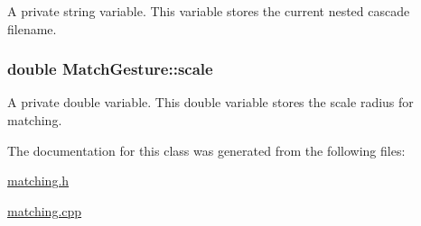 \label{classMatchGesture_aacb8c478358eee5b075988893f267737}
A private string variable. This variable stores the current nested cascade filename. \hypertarget{classMatchGesture_af3bb3af0d54664793eeaa80cf6249750}{
\subsubsection[{scale}]{\setlength{\rightskip}{0pt plus 5cm}double {\bf MatchGesture::scale}}}
\label{classMatchGesture_af3bb3af0d54664793eeaa80cf6249750}
A private double variable. This double variable stores the scale radius for matching. 

The documentation for this class was generated from the following files:\begin{DoxyCompactItemize}
\item 
\hyperlink{matching_8h}{matching.h}\item 
\hyperlink{matching_8cpp}{matching.cpp}\end{DoxyCompactItemize}
